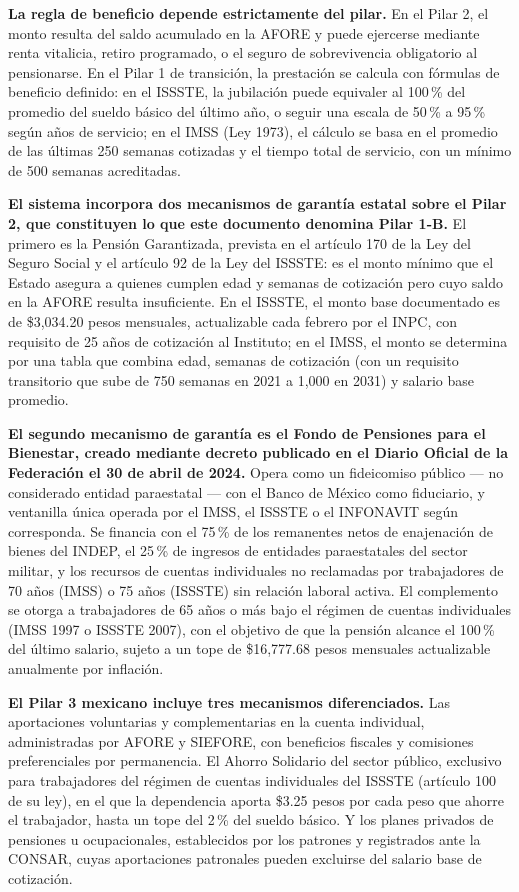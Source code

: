\documentclass[12pt, letterpaper]{article}
\begin{document}
\textbf{La regla de beneficio depende estrictamente del pilar.} En el Pilar 2, el monto resulta del saldo acumulado en la AFORE y puede ejercerse mediante renta vitalicia, retiro programado, o el seguro de sobrevivencia obligatorio al pensionarse. En el Pilar 1 de transición, la prestación se calcula con fórmulas de beneficio definido: en el ISSSTE, la jubilación puede equivaler al 100\,\% del promedio del sueldo básico del último año, o seguir una escala de 50\,\% a 95\,\% según años de servicio; en el IMSS (Ley 1973), el cálculo se basa en el promedio de las últimas 250 semanas cotizadas y el tiempo total de servicio, con un mínimo de 500 semanas acreditadas.

\textbf{El sistema incorpora dos mecanismos de garantía estatal sobre el Pilar 2, que constituyen lo que este documento denomina Pilar 1-B.} El primero es la Pensión Garantizada, prevista en el artículo 170 de la Ley del Seguro Social y el artículo 92 de la Ley del ISSSTE: es el monto mínimo que el Estado asegura a quienes cumplen edad y semanas de cotización pero cuyo saldo en la AFORE resulta insuficiente. En el ISSSTE, el monto base documentado es de \$3,034.20 pesos mensuales, actualizable cada febrero por el INPC, con requisito de 25 años de cotización al Instituto; en el IMSS, el monto se determina por una tabla que combina edad, semanas de cotización (con un requisito transitorio que sube de 750 semanas en 2021 a 1,000 en 2031) y salario base promedio.

\textbf{El segundo mecanismo de garantía es el Fondo de Pensiones para el Bienestar, creado mediante decreto publicado en el Diario Oficial de la Federación el 30 de abril de 2024.} Opera como un fideicomiso público --- no considerado entidad paraestatal --- con el Banco de México como fiduciario, y ventanilla única operada por el IMSS, el ISSSTE o el INFONAVIT según corresponda. Se financia con el 75\,\% de los remanentes netos de enajenación de bienes del INDEP, el 25\,\% de ingresos de entidades paraestatales del sector militar, y los recursos de cuentas individuales no reclamadas por trabajadores de 70 años (IMSS) o 75 años (ISSSTE) sin relación laboral activa. El complemento se otorga a trabajadores de 65 años o más bajo el régimen de cuentas individuales (IMSS 1997 o ISSSTE 2007), con el objetivo de que la pensión alcance el 100\,\% del último salario, sujeto a un tope de \$16,777.68 pesos mensuales actualizable anualmente por inflación.

\textbf{El Pilar 3 mexicano incluye tres mecanismos diferenciados.} Las aportaciones voluntarias y complementarias en la cuenta individual, administradas por AFORE y SIEFORE, con beneficios fiscales y comisiones preferenciales por permanencia. El Ahorro Solidario del sector público, exclusivo para trabajadores del régimen de cuentas individuales del ISSSTE (artículo 100 de su ley), en el que la dependencia aporta \$3.25 pesos por cada peso que ahorre el trabajador, hasta un tope del 2\,\% del sueldo básico. Y los planes privados de pensiones u ocupacionales, establecidos por los patrones y registrados ante la CONSAR, cuyas aportaciones patronales pueden excluirse del salario base de cotización.
\end{document}
